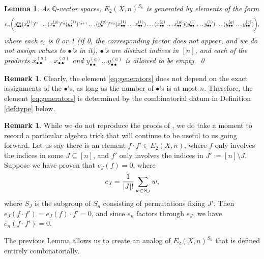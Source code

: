\documentclass[11pt,reqno]{amsproc}
\numberwithin{equation}{section}
\newtheorem{lemma}[theorem]{Lemma}
\theoremstyle{definition}
\newtheorem{remark}[theorem]{Remark}
\theoremstyle{remark}
\newcommand\Q{{\mathbb Q}}
\newcommand\subeq{\subseteq}
\DeclarePairedDelimiter{\abs}{\lvert}{\rvert}
\DeclarePairedDelimiter{\parens}{\lparen}{\rparen}
\newcommand{\spp}[1]{^{(#1)}}
\begin{document}
\begin{lemma}
As $\Q$-vector spaces, $E_2(X,n)^{S_n}$ is generated by elements of the form
\begin{equation}\label{eq:generators}
e_n\parens[\bigg]{g_{\bullet\bullet}^{\epsilon_0}(x\spp{1}_\bullet)^{\epsilon_1} \dots (x\spp{g}_\bullet)^{\epsilon_g} (y\spp{1}_\bullet)^{\epsilon_{g+1}} \dots (y\spp{g}_\bullet)^{\epsilon_{2g}} (x\spp{1}_{\bullet\bullet}\dots x\spp{1}_{\bullet\bullet})\dots (x\spp{g}_{\bullet\bullet}\dots x\spp{g}_{\bullet\bullet}) (y\spp{1}_{\bullet\bullet}\dots y\spp{1}_{\bullet\bullet})\dots (y\spp{g}_{\bullet\bullet}\dots y\spp{g}_{\bullet\bullet})
},
\end{equation}
where each $\epsilon_i$ is 0 or 1 (if 0, the corresponding factor does not appear, and we do not assign values to $\bullet$'s in it), $\bullet$'s are distinct indices in $[n]$, and each of the products $x\spp{a}_{\bullet\bullet}\dots x\spp{a}_{\bullet\bullet}$ and $y\spp{a}_{\bullet\bullet}\dots y\spp{a}_{\bullet\bullet}$ is allowed to be empty. \qed
\end{lemma}

\begin{remark}
Clearly, the element \eqref{eq:generators} does not depend on the exact assignments of the $\bullet$'s, as long as the number of $\bullet$'s is at most $n$. Therefore, the element \eqref{eq:generators} is determined by the combinatorial datum in Definition \ref{def:type} below.
\end{remark}

\begin{remark} \label{rmk:algebraTrick}
While we do not reproduce the proofs of \cite{cheonghuang2022betti}, we do take a moment to record a particular algebra trick that will continue to be useful to us going forward. Let us say there is an element $f\cdot f'\in E_2(X,n)$, where $f$ only involves the indices in some $J\subeq [n]$, and $f'$ only involves the indices in $J':=[n]\setminus J$. Suppose we have proven that $e_J(f)=0$, where
\begin{equation}
e_J=\frac{1}{\abs{J}!}\sum_{w\in S_{J}} w,
\end{equation}
where $S_J$ is the subgroup of $S_n$ consisting of permutations fixing $J'$. Then $e_J(f\cdot f')=e_J(f)\cdot f'=0$, and since $e_n$ factors through $e_J$, we have $e_n(f\cdot f')=0$. 
\end{remark}

The previous Lemma allows us to create an analog of $E_2(X,n)^{S_n}$ that is defined entirely combinatorially.\\
\end{document}
